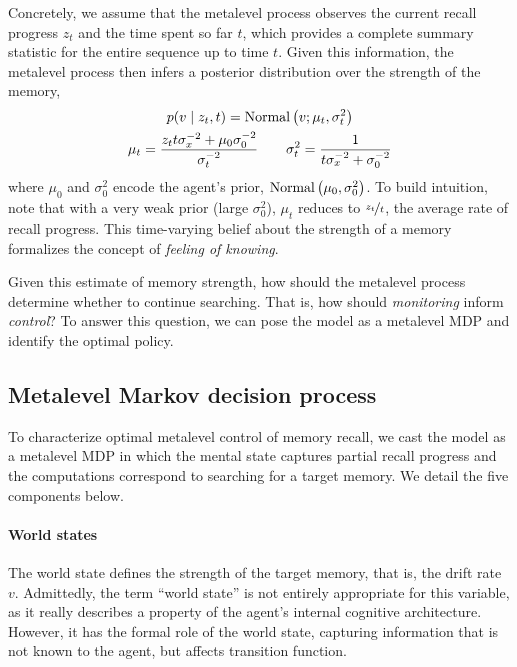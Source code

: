 Concretely, we assume that the metalevel process observes the current recall progress $z_t$ and the time spent so far $t$, which provides a complete summary statistic for the entire sequence up to time $t$. Given this information, the metalevel process then infers a posterior distribution over the strength of the memory,
%
\begin{equation}\label{eq:belief}
\begin{gathered}
  p(v \mid z_t, t) = \mathrm{Normal}\left( v; \mu_t, \sigma_t^2 \right) \\
  \mu_t = \frac{z_t t \sigma_x^{-2} + \mu_0 \sigma_0^{-2}}{\sigma_t^{-2}} 
  \quad\quad
  \sigma_t^2 = \frac{1}{t \sigma_x^{-2} + \sigma_0^{-2}}
\end{gathered}
\end{equation}
%
where $\mu_0$ and $\sigma_0^2$ encode the agent's prior, $\mathrm{Normal}\left( \mu_0, \sigma_0^2 \right)$. To build intuition, note that with a very weak prior (large $\sigma_0^2$), $\mu_t$ reduces to $\nicefrac{z_t}{t}$, the average rate of recall progress. This time-varying belief about the strength of a memory formalizes the concept of \emph{feeling of knowing}.

Given this estimate of memory strength, how should the metalevel process determine whether to continue searching. That is, how should \emph{monitoring} inform \emph{control}? To answer this question, we can pose the model as a metalevel MDP and identify the optimal policy.

\subsection{Metalevel Markov decision process}

To characterize optimal metalevel control of memory recall, we cast the model as a metalevel MDP in which the mental state captures partial recall progress and the computations correspond to searching for a target memory. We detail the five components below.


\paragraph{World states}
The world state defines the strength of the target memory, that is, the drift rate $v$. Admittedly, the term ``world state'' is not entirely appropriate for this variable, as it really describes a property of the agent's internal cognitive architecture. However, it has the formal role of the world state, capturing information that is not known to the agent, but affects transition function.

